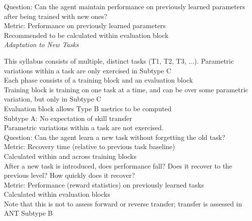     Question: Can the agent maintain performance on previously learned parameters after being trained with new ones?\\
        Metric: Performance on previously learned parameters\\
            Recommended to be calculated within evaluation block\\

\textit{Adaptation to New Tasks}

    This syllabus consists of multiple, distinct tasks  (T1, T2, T3, ...). Parametric variations within a task are only exercised in Subtype C\\
    Each phase consists of a training block and an evaluation block\\
        Training block is training on one task at a time, and can be over some parametric variation, but only in Subtype C\\
        Evaluation block allows Type B metrics to be computed\\

    Subtype A: No expectation of skill transfer\\
        Parametric variations within a task are not exercised.\\
            Question: Can the agent learn a new task without forgetting the old task?\\
                Metric: Recovery time (relative to previous task baseline)\\
                    Calculated within and across training blocks \\
                    After a new task is introduced, does performance fall? Does it recover to the previous level? How quickly does it recover? \\
                Metric: Performance (reward statistics) on previously learned tasks\\
                    Calculated within evaluation blocks\\
                    Note that this is not to assess forward or reverse transfer; transfer is assessed in ANT Subtype B\\
                    
